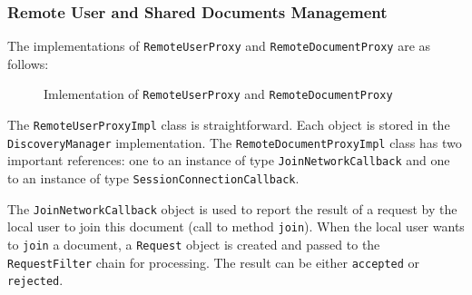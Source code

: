 \subsubsection{Remote User and Shared Documents Management}
The implementations of \texttt{RemoteUserProxy} and  \texttt{RemoteDocumentProxy} are as follows:

\begin{figure}[H]
 \centering
 \caption{Imlementation of \texttt{RemoteUserProxy} and \texttt{RemoteDocumentProxy}}
 \label{fig:network.protocol.userimpl.uml}
\end{figure}

The \texttt{RemoteUserProxyImpl} class is straightforward. Each object is stored in the \texttt{DiscoveryManager} implementation. The \texttt{RemoteDocumentProxyImpl} class has two important references: one to an instance of type \texttt{JoinNetworkCallback} and one to an instance of type \texttt{SessionConnectionCallback}. 

The \texttt{JoinNetworkCallback} object is used to report the result of a request by the local user to join this document (call to method \texttt{join}). When the local user wants to \texttt{join} a document, a \texttt{Request} object is created and passed to the \texttt{RequestFilter} chain for processing. The result can be either \texttt{accepted} or \texttt{rejected}.

